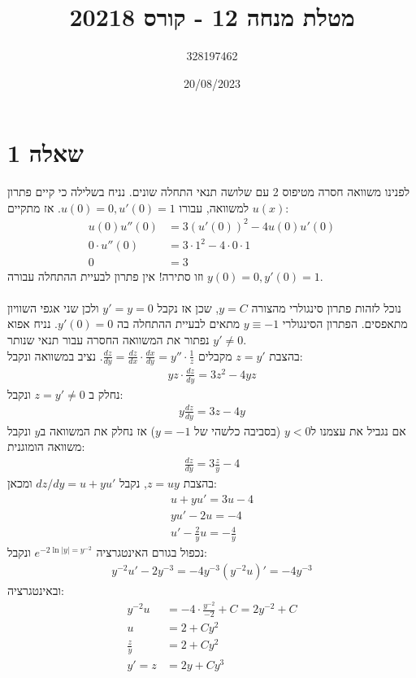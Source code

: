 \documentclass{article}
\title{מטלת מנחה 12 - קורס 20218}
\author{328197462}
\date{20/08/2023}
\begin{document}
\maketitle

\section*{שאלה 1}
לפנינו משוואה חסרה מטיפוס 2 עם שלושה תנאי התחלה שונים.
נניח בשלילה כי קיים פתרון $u(x)$ למשוואה, עבורו $u(0)=0, u'(0)=1$. אז מתקיים:
\begin{align*}
    u(0)u''(0)     & =3(u'(0))^2-4u(0)u'(0)          \\
    0 \cdot u''(0) & = 3\cdot 1^2 - 4\cdot 0 \cdot 1 \\
    0              & = 3
\end{align*}
וזו סתירה! אין פתרון לבעיית ההתחלה עבורה $y(0)=0, y'(0)=1$.\\\\
נוכל לזהות פתרון סינגולרי מהצורה $y=C$, שכן אז נקבל $y'=y=0$ ולכן שני אגפי השוויון מתאפסים.
הפתרון הסינגולרי $y\equiv-1$ מתאים לבעיית ההתחלה בה $y'(0)=0$.
נניח אפוא $y'\ne 0$ נפתור את המשוואה החסרה עבור תנאי שנותר. \\
בהצבת $z=y'$ מקבלים $\frac{dz}{dy}=\frac{dz}{dx}\cdot \frac{dx}{dy} = y''\cdot \frac{1}{z}$. נציב במשוואה ונקבל:
\begin{align*}
    yz\cdot \frac{dz}{dy} = 3z^2-4yz
\end{align*}
נחלק ב $z=y'\ne 0$ ונקבל:
\begin{align*}
    y \frac{dz}{dy} = 3z-4y
\end{align*}
אם נגביל את עצמנו ל$y<0$ (בסביבה כלשהי של $y=-1$) אז נחלק את המשוואה ב$y$ ונקבל משוואה הומוגנית:
\begin{align*}
    \frac{dz}{dy} = 3\frac{z}{y} - 4
\end{align*}
בהצבת $z=uy$, נקבל $dz/dy = u + yu'$ ומכאן:
\begin{align*}
    u+yu'=3u-4 \\
    yu'-2u=-4  \\
    u'-\frac{2}{y}u=-\frac{4}{y}
\end{align*}
נכפול בגורם האינטגרציה $e^{-2\ln|y|=y^{-2}}$ ונקבל:
\begin{align*}
    y^{-2}u'-2y^{-3} = -4y^{-3}
    (y^{-2}u)'=-4y^{-3}
\end{align*}
ובאינטגרציה:
\begin{align*}
    y^{-2}u     & =-4\cdot\frac{y^{-2}}{-2}+C=2y^{-2}+C \\
    u           & = 2 + Cy^2                            \\
    \frac{z}{y} & = 2 + Cy^2                            \\
    y'=z        & =2y+Cy^3
\end{align*}
\end{document}
